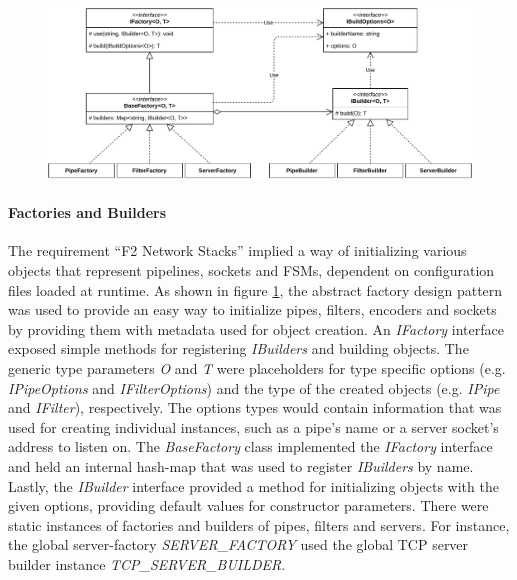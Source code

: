 \begin{figure}[h]
    \centering
    \includegraphics[width=14cm]{img/ch04/prototype/factory-builder.pdf}
    \label{fig:prototype-factory-builder}
\end{figure}

\paragraph{Factories and Builders}
The requirement \enquote{F2 Network Stacks} implied a way of initializing various objects that represent pipelines, sockets and \acp{FSM}, dependent on configuration files loaded at runtime. As shown in figure \ref{fig:prototype-factory-builder}, the abstract factory design pattern was used to provide an easy way to initialize pipes, filters, encoders and sockets by providing them with metadata used for object creation. An \emph{IFactory} interface exposed simple methods for registering \emph{IBuilders} and building objects. The generic type parameters \emph{O} and \emph{T} were placeholders for type specific options (e.g. \emph{IPipeOptions} and \emph{IFilterOptions}) and the type of the created objects (e.g. \emph{IPipe} and \emph{IFilter}), respectively. The options types would contain information that was used for creating individual instances, such as a pipe's name or a server socket's address to listen on. The \emph{BaseFactory} class implemented the \emph{IFactory} interface and held an internal hash-map that was used to register \emph{IBuilders} by name. Lastly, the \emph{IBuilder} interface provided a method for initializing objects with the given options, providing default values for constructor parameters. There were static instances of factories and builders of pipes, filters and servers. For instance, the global server-factory \emph{SERVER\_FACTORY} used the global TCP server builder instance \emph{TCP\_SERVER\_BUILDER}.

